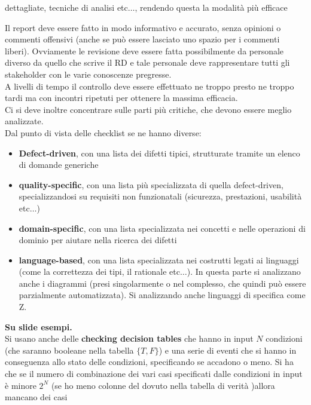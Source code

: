 \documentclass[a4paper,12pt, oneside]{book}
\begin{document}
\begin{itemize}
\begin{itemize}
    dettagliate, tecniche di analisi etc$\ldots$, rendendo questa la modalità
    più efficace
  \end{itemize}
  Il report deve essere fatto in modo informativo e accurato, senza opinioni o
  commenti offensivi (anche se può essere lasciato uno spazio per i commenti
  liberi). Ovviamente le revisione deve essere fatta possibilmente da personale
  diverso da quello che scrive il RD e tale personale deve rappresentare tutti
  gli stakeholder con le varie conoscenze pregresse. \\
  A livelli di tempo il controllo deve essere effettuato ne troppo presto ne
  troppo tardi ma con incontri ripetuti per ottenere la massima efficacia. \\
  Ci si deve inoltre concentrare sulle parti più critiche, che devono essere
  meglio analizzate.\\
  Dal punto di vista delle checklist se ne hanno diverse:
  \begin{itemize}
    \item \textbf{Defect-driven}, con una lista dei difetti tipici, strutturate
    tramite un elenco di domande generiche
    \item \textbf{quality-specific}, con una lista più specializzata di quella
    defect-driven, specializzandosi su requisiti non funzionatali (sicurezza,
    prestazioni, usabilità etc$\ldots$)
    \item \textbf{domain-specific}, con una lista specializzata nei concetti e
    nelle operazioni di dominio per aiutare nella ricerca dei difetti
    \item \textbf{language-based}, con una lista specializzata nei costrutti
    legati ai linguaggi (come la correttezza dei tipi, il rationale
    etc$\ldots$). In questa parte si analizzano anche i diagrammi (presi
    singolarmente o nel complesso, che quindi può essere parzialmente
    automatizzata). Si analizzando anche linguaggi di specifica come Z.\\
  \end{itemize}
  \textbf{Su slide esempi.}\\
  Si usano anche delle \textbf{checking decision tables} che hanno in input $N$
  condizioni (che saranno booleane nella tabella $\{T,F\}$) e una serie di
  eventi che si hanno in conseguenza allo stato delle condizioni, specificando
  se accadono o meno. Si ha che se il numero di combinazione dei vari casi
  specificati dalle condizioni in input è minore $2^N$ (se ho meno colonne del
  dovuto nella tabella di verità )allora mancano dei casi

\end{itemize}
\end{document}
